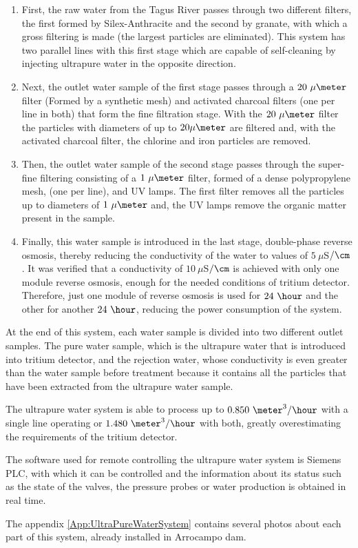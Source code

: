 \begin{enumerate}
\item{} First, the raw water from the Tagus River passes through two different filters, the first formed by Silex-Anthracite and the second by granate, with which a gross filtering is made (the largest particles are eliminated). This system has two parallel lines with this first stage which are capable of self-cleaning by injecting ultrapure water in the opposite direction.

\item{} Next, the outlet water sample of the first stage passes through a $20~\mu\meter$ filter (Formed by a synthetic mesh) and activated charcoal filters (one per line in both) that form the fine filtration stage. With the $20~\mu\meter$ filter the particles with diameters of up to $20\mu\meter$ are filtered and, with the activated charcoal filter, the chlorine and iron particles are removed.

\item{} Then, the outlet water sample of the second stage passes through the super-fine filtering consisting of a $1~\mu\meter$ filter, formed of a dense polypropylene mesh, (one per line), and UV lamps. The first filter removes all the particles up to diameters of $1~\mu\meter$ and, the UV lamps remove the organic matter present in the sample.

\item{} Finally, this water sample is introduced in the last stage, double-phase reverse osmosis, thereby reducing the conductivity of the water to values of $5~\mu$S$/\cm$. It was verified that a conductivity of $10~\mu$S$/\cm$ is achieved with only one module reverse osmosis, enough for the needed conditions of tritium detector. Therefore, just one module of reverse osmosis is used for $24~\hour$ and the other for another $24~\hour$, reducing the power consumption of the system.

\end{enumerate}

At the end of this system, each water sample is divided into two different outlet samples. The pure water sample, which is the ultrapure water that is introduced into tritium detector, and the rejection water, whose conductivity is even greater than the water sample before treatment because it contains all the particles that have been extracted from the ultrapure water sample.

The ultrapure water system is able to process up to $0.850~\meter^3/\hour$ with a single line operating or $1.480~\meter^3/\hour$ with both, greatly overestimating the requirements of the tritium detector. 

The software used for remote controlling the ultrapure water system is Siemens PLC, with which it can be controlled and the information about its status such as the state of the valves, the pressure probes or water production is obtained in real time. 

The appendix \ref{App:UltraPureWaterSystem} contains several photos about each part of this system, already installed in Arrocampo dam.
